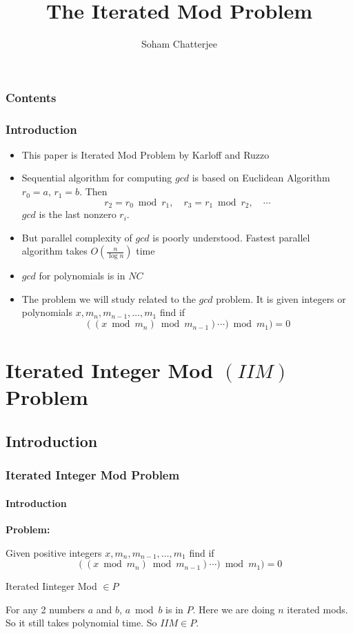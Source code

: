 \documentclass[article,10pt]{beamer}%
\title{The Iterated Mod Problem}
\author{\LARGE{Soham Chatterjee}}
\institute{\large{Chennai Mathematical Institute}}
\begin{document}
\maketitle


\begin{frame}
    \frametitle{Contents}
    \tableofcontents
\end{frame}



\begin{frame}
    \frametitle{Introduction}
\begin{itemize}
    \item This paper is  Iterated Mod Problem by Karloff and Ruzzo \cite{iteratedmod}
    \item  Sequential algorithm for computing $gcd$ is based on Euclidean Algorithm
    $r_0=a$, $r_1=b$. Then $$r_2=r_0\bmod{r_1},\quad r_{3}=r_{1}\bmod{r_2}, \quad \cdots$$ $gcd$ is the last nonzero $r_i$.
    \item But parallel complexity of $gcd$ is poorly understood. Fastest parallel  algorithm takes $O\left(\frac{n}{\log n}\right)$ time \cite{gcdfastpar}
    \item $gcd$ for polynomials is in $NC$
    \item  The problem we will study related to the $gcd$ problem. It is given  integers or polynomials $x, m_n,m_{n-1},\dots, m_1$  find if $$((x\bmod{m_{n}})\bmod{m_{n-1}})\cdots)\bmod{m_{1}})=0$$
\end{itemize}
\end{frame}
\section{Iterated Integer Mod $(IIM)$ Problem}
\subsection{Introduction}
\begin{frame}
	\frametitle{Iterated Integer Mod Problem}
	\framesubtitle{Introduction}
	\textbf{Problem:}
	
		 Given positive integers $x, m_n,m_{n-1},\dots, m_1$  find if $$((x\bmod{m_{n}})\bmod{m_{n-1}})\cdots)\bmod{m_{1}})=0$$
\vspace{3mm}
		 \begin{theorem}
		Iterated Iinteger Mod $\in P$
	\end{theorem}
	For any 2 numbers $a$ and $b$, $a\bmod{b}$ is in $P$. Here we are doing $n$ iterated mods. So it still takes polynomial time. So $IIM\in P$.
\end{frame}
\end{document}
